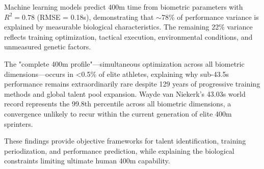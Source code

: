 \documentclass[twocolumn,10pt]{article}
\begin{document}
Machine learning models predict 400m time from biometric parameters with $R^2 = 0.78$ (RMSE = 0.18s), demonstrating that $\sim$78\% of performance variance is explained by measurable biological characteristics. The remaining 22\% variance reflects training optimization, tactical execution, environmental conditions, and unmeasured genetic factors.

The "complete 400m profile"—simultaneous optimization across all biometric dimensions—occurs in <0.5\% of elite athletes, explaining why sub-43.5s performance remains extraordinarily rare despite 129 years of progressive training methods and global talent pool expansion. Wayde van Niekerk's 43.03s world record represents the 99.8th percentile across all biometric dimensions, a convergence unlikely to recur within the current generation of elite 400m sprinters.

These findings provide objective frameworks for talent identification, training periodization, and performance prediction, while explaining the biological constraints limiting ultimate human 400m capability.



\end{document}
